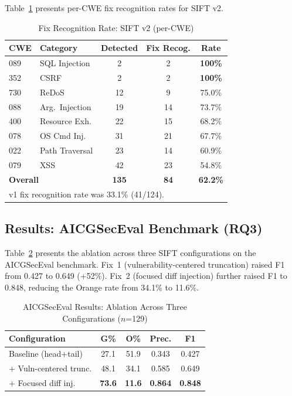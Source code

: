 \documentclass[conference]{IEEEtran}
\begin{document}
Table~\ref{tab_fixrecog} presents per-CWE fix recognition rates for SIFT v2.

\begin{table}[htbp]
\caption{Fix Recognition Rate: SIFT v2 (per-CWE)}
\begin{center}
\begin{tabular}{|l|l|c|c|c|}
\hline
\textbf{CWE} & \textbf{Category} & \textbf{Detected} & \textbf{Fix Recog.} & \textbf{Rate} \\
\hline
089 & SQL Injection & 2 & 2 & \textbf{100\%} \\
\hline
352 & CSRF & 2 & 2 & \textbf{100\%} \\
\hline
730 & ReDoS & 12 & 9 & 75.0\% \\
\hline
088 & Arg.\ Injection & 19 & 14 & 73.7\% \\
\hline
400 & Resource Exh. & 22 & 15 & 68.2\% \\
\hline
078 & OS Cmd Inj. & 31 & 21 & 67.7\% \\
\hline
022 & Path Traversal & 23 & 14 & 60.9\% \\
\hline
079 & XSS & 42 & 23 & 54.8\% \\
\hline
\hline
\multicolumn{2}{|l|}{\textbf{Overall}} & \textbf{135} & \textbf{84} & \textbf{62.2\%} \\
\hline
\multicolumn{5}{l}{v1 fix recognition rate was 33.1\% (41/124).}
\end{tabular}
\label{tab_fixrecog}
\end{center}
\end{table}

\subsection{Results: AICGSecEval Benchmark (RQ3)}

Table~\ref{tab_aicgseceval} presents the ablation across three SIFT configurations on the AICGSecEval benchmark. Fix~1 (vulnerability-centered truncation) raised F1 from 0.427 to 0.649 (+52\%). Fix~2 (focused diff injection) further raised F1 to 0.848, reducing the Orange rate from 34.1\% to 11.6\%.

\begin{table}[htbp]
\caption{AICGSecEval Results: Ablation Across Three Configurations ($n$=129)}
\begin{center}
\begin{tabular}{|l|c|c|c|c|}
\hline
\textbf{Configuration} & \textbf{G\%} & \textbf{O\%} & \textbf{Prec.} & \textbf{F1} \\
\hline
Baseline (head+tail) & 27.1 & 51.9 & 0.343 & 0.427 \\
\hline
+ Vuln-centered trunc. & 48.1 & 34.1 & 0.585 & 0.649 \\
\hline
+ Focused diff inj. & \textbf{73.6} & \textbf{11.6} & \textbf{0.864} & \textbf{0.848} \\
\hline
\end{tabular}
\label{tab_aicgseceval}
\end{center}
\end{table}
\end{document}
